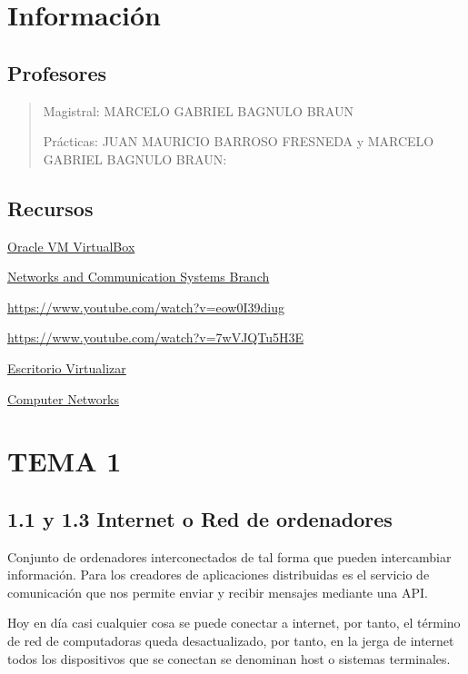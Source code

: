 \documentclass[12pt, twoside, openright]{report} %
\begin{document}

\chapter{Información}
\section{Profesores}
\begin{quote}
	Magistral: MARCELO GABRIEL BAGNULO BRAUN

	Prácticas: JUAN MAURICIO BARROSO FRESNEDA y MARCELO GABRIEL BAGNULO BRAUN:
\end{quote}

\section{Recursos}

\href{https://www.virtualbox.org/}{Oracle VM VirtualBox}

\href{https://www.nrl.navy.mil/itd/ncs/products/core}{Networks and
	Communication Systems Branch}

\url{https://www.youtube.com/watch?v=eow0I39diug}

\url{https://www.youtube.com/watch?v=7wVJQTu5H3E}

\href{http://www.ingebook.com/ib/NPcd/IB_Escritorio_Visualizar?cod_primaria=1000193\&libro=6752}{Escritorio Virtualizar}

\href{https://padlet.com/fvalera/8njxmoxyj4qgck6d}{Computer Networks}


\chapter{TEMA 1}

\section{1.1 y 1.3 Internet o Red de ordenadores}

Conjunto de ordenadores interconectados de tal forma que pueden
intercambiar información. Para los creadores de aplicaciones
distribuidas es el servicio de comunicación que nos permite enviar y
recibir mensajes mediante una API.

Hoy en día casi cualquier cosa se puede conectar a internet, por
tanto, el término de red de computadoras queda desactualizado, por
tanto, en la jerga de internet todos los dispositivos que se conectan
se denominan host o sistemas terminales.
\end{document}
